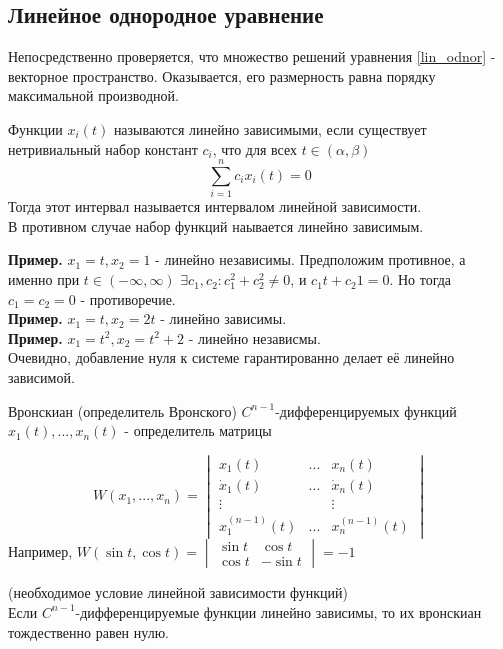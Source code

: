 \subsection{Линейное однородное уравнение}
Непосредственно проверяется, что множество решений уравнения \ref{lin_odnor} -
векторное пространство. Оказывается, его размерность равна порядку 
максимальной производной.
\begin{defin}
Функции $x_i(t)$ называются линейно зависимыми, если существует нетривиальный
набор констант  $c_i$, что для всех $t\in (\alpha,\beta)$
$$\sum\limits_{i=1}^{n} c_ix_i(t)=0$$
Тогда этот интервал называется интервалом линейной зависимости.\\
В противном случае набор функций наывается линейно зависимым. 
\end{defin}
\textbf{Пример.} $x_1=t,x_2=1$ - линейно независимы. Предположим противное, 
а именно при $t\in (-\infty,\infty)$ $\exists  c_1,c_2:c_1^2+c_2^2\ne 0$, и
$c_1t+c_{2}1=0$. Но тогда $c_1=c_2=0$ - противоречие. \\
\textbf{Пример.} $x_1=t,x_2=2t$ - линейно зависимы.\\
\textbf{Пример.} $x_1=t^2,x_2=t^2+2$ - линейно независмы.\\
Очевидно, добавление нуля к системе гарантированно делает её линейно зависимой.
\begin{defin}
    Вронскиан (определитель Вронского) $C^{n-1}$-дифференцируемых функций
     $x_1(t),...,x_n(t)$ - определитель матрицы
\end{defin}
\begin{equation}
    W(x_1,...,x_n) = \begin{vmatrix}
        x_1(t) & ... & x_n(t) \\
        \dot x_1(t) & ... & \dot x_n(t) \\
        \vdots & & \vdots \\
        x_1^{(n-1)}(t) & ... & x_n^{(n-1)}(t)
    \end{vmatrix} 
\end{equation}
Например, $W(\sin t, \cos t)=\begin{vmatrix} \sin t &\cos t\\ \cos t&-\sin t
\end{vmatrix} = -1$
\begin{theor}
    (необходимое условие линейной зависимости функций)\\
    Если $C^{n-1}$-дифференцируемые функции линейно зависимы, то их вронскиан
    тождественно равен нулю.
\end{theor}
